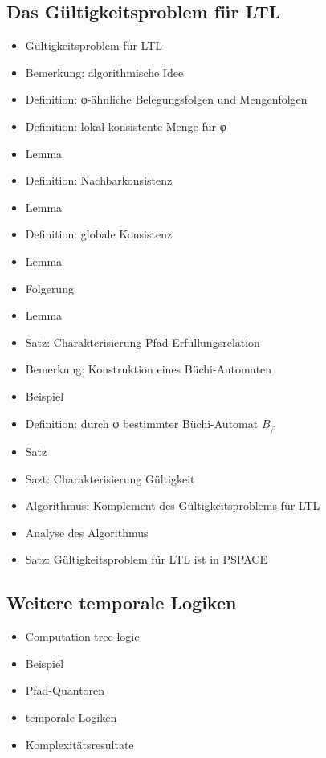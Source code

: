 \documentclass[8pt,fleqn,a4paper,twoside]{article}
\begin{document}
\begin{multicols}{2}
    \subsection{Das Gültigkeitsproblem für LTL} %
    \label{sub:das_gültigkeitsproblem_für_ltl}
      \begin{itemize}
        \item Gültigkeitsproblem für LTL
        \item Bemerkung: algorithmische Idee
        \item Definition: φ-ähnliche Belegungsfolgen und Mengenfolgen
        \item Definition: lokal-konsistente Menge für φ
        \item Lemma
        \item Definition: Nachbarkonsistenz
        \item Lemma
        \item Definition: globale Konsistenz
        \item Lemma
        \item Folgerung
        \item Lemma
        \item Satz: Charakterisierung Pfad-Erfüllungsrelation
        \item Bemerkung: Konstruktion eines Büchi-Automaten
        \item Beispiel
        \item Definition: durch φ bestimmter Büchi-Automat $B_φ$
        \item Satz
        \item Sazt: Charakterisierung Gültigkeit
        \item Algorithmus: Komplement des Gültigkeitsproblems für LTL
        \item Analyse des Algorithmus
        \item Satz: Gültigkeitsproblem für LTL ist in PSPACE
      \end{itemize}

    \subsection{Weitere temporale Logiken} %
    \label{sub:weitere_temporale_logiken}
      \begin{itemize}
        \item Computation-tree-logic
        \item Beispiel
        \item Pfad-Quantoren
        \item temporale Logiken
        \item Komplexitätsresultate
      \end{itemize}


  \end{multicols}
\end{document}
